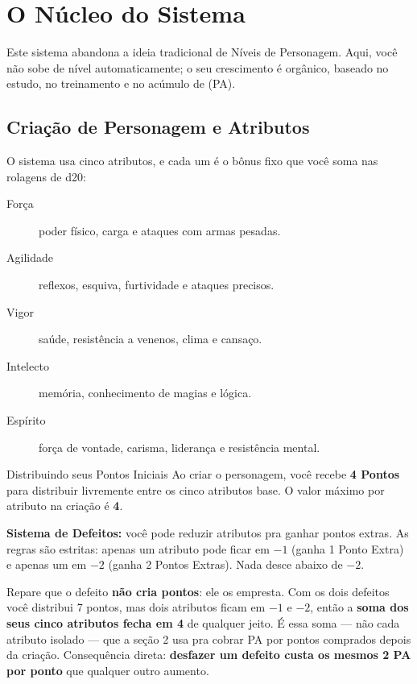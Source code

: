 \chapter{O Núcleo do Sistema}

Este sistema abandona a ideia tradicional de Níveis de Personagem. Aqui, você não sobe de
nível automaticamente; o seu crescimento é orgânico, baseado no estudo, no treinamento e
no acúmulo de  (PA).

\section{Criação de Personagem e Atributos}

O sistema usa cinco atributos, e cada um é o bônus fixo que você soma nas rolagens de
d20:

\begin{description}
    \item[Força] poder físico, carga e ataques com armas pesadas.
    \item[Agilidade] reflexos, esquiva, furtividade e ataques precisos.
    \item[Vigor] saúde, resistência a venenos, clima e cansaço.
    \item[Intelecto] memória, conhecimento de magias e lógica.
    \item[Espírito] força de vontade, carisma, liderança e resistência mental.
\end{description}

\begin{nota}{Distribuindo seus Pontos Iniciais}
    Ao criar o personagem, você recebe \textbf{4 Pontos} para distribuir livremente entre
    os cinco atributos base. O valor máximo por atributo na criação é \textbf{4}.

    \medskip
    \textbf{Sistema de Defeitos:} você pode reduzir atributos pra ganhar pontos extras. As
    regras são estritas: apenas um atributo pode ficar em $-1$ (ganha 1 Ponto Extra) e
    apenas um em $-2$ (ganha 2 Pontos Extras). Nada desce abaixo de $-2$.

    \medskip
    Repare que o defeito \textbf{não cria pontos}: ele os empresta. Com os dois defeitos
    você distribui 7 pontos, mas dois atributos ficam em $-1$ e $-2$, então a \textbf{soma
    dos seus cinco atributos fecha em 4} de qualquer jeito. É essa soma --- não cada
    atributo isolado --- que a seção 2 usa pra cobrar PA por pontos comprados depois da
    criação. Consequência direta: \textbf{desfazer um defeito custa os mesmos 2 PA por
    ponto} que qualquer outro aumento.
\end{nota}


